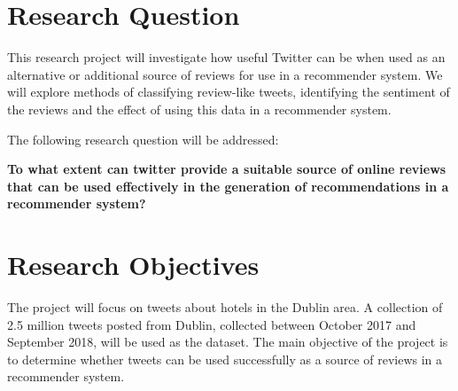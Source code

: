 \section{Research Question}
This research project will investigate how useful Twitter can be when used as an alternative or additional source of reviews for use in a recommender system. We will explore methods of classifying review-like tweets, identifying the sentiment of the reviews and the effect of using this data in a recommender system.

The following research question will be addressed:
\begin{center}
\textbf{To what extent can twitter provide a suitable source of online reviews that can be used effectively in the generation of recommendations in a recommender system?}
\end{center}

\section{Research Objectives}
The project will focus on tweets about hotels in the Dublin area. A collection of 2.5 million tweets posted from Dublin, collected between October 2017 and September 2018, will be used as the dataset. The main objective of the project is to determine whether tweets can be used successfully as a source of reviews in a recommender system.

